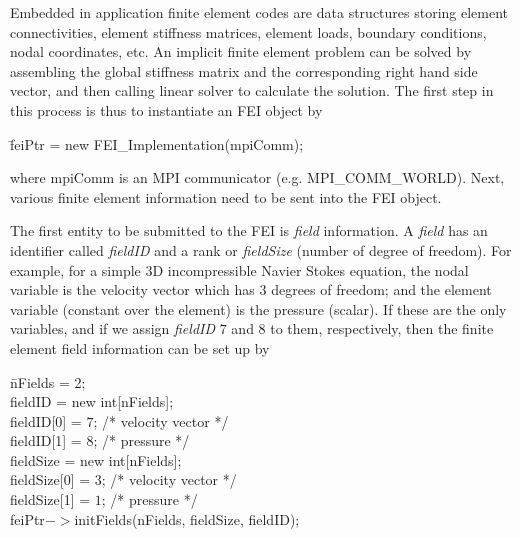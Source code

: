Embedded in application finite element codes are data structures
storing element connectivities, element stiffness matrices, element
loads, boundary conditions, nodal coordinates, etc. An implicit finite
element problem can be solved by assembling the global stiffness matrix
and the corresponding right hand side vector, and then calling linear
solver to calculate the solution. The first step in this process is 
thus to instantiate an {\sf FEI} object by
\begin{tabbing}
\hspace{0.5in} \= {\sf feiPtr = new FEI\_Implementation(mpiComm);}
\end{tabbing}
where {\sf mpiComm} is an MPI communicator (e.g. {\sf MPI\_COMM\_WORLD}).
Next, various finite element information need to be sent into the {\sf FEI}
object.

The first entity to be submitted to the {\sf FEI} is {\it field} information. 
A {\it field} has an identifier called {\it fieldID} and a rank or
{\it fieldSize} (number of degree of freedom). For example, for a simple
3D incompressible Navier Stokes equation, the nodal variable is the velocity
vector which has $3$ degrees of freedom; and the element variable (constant
over the element) is the pressure (scalar). If these are the only variables,
and if we assign {\it fieldID} $7$ and $8$ to them, respectively, then the
finite element field information can be set up by
\begin{tabbing}
\hspace{0.5in} \= {\sf nFields = 2;} \\
               \> {\sf fieldID = new int[nFields];} \\
               \> {\sf fieldID[0] = $7$; /* velocity vector */} \\
               \> {\sf fieldID[1] = $8$; /* pressure */} \\
               \> {\sf fieldSize = new int[nFields];} \\
               \> {\sf fieldSize[0] = $3$; /* velocity vector */} \\
               \> {\sf fieldSize[1] = $1$; /* pressure */ } \\
               \> {\sf feiPtr$->$initFields(nFields, fieldSize, fieldID);}
\end{tabbing}


